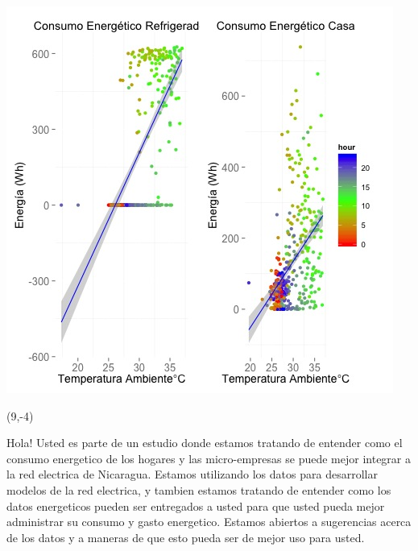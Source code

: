 \documentclass{article}\usepackage[]{graphicx}\usepackage[]{color}
\newenvironment{knitrout}{}{} %
\begin{document}
\begin{knitrout}
\color{fgcolor}
\includegraphics[scale=0.75]{figure/A19_correlaciones} 
\end{knitrout}

 \begin{textblock}{1}(9,-4)
\begin{minipage}{20em}
\begingroup

\endgroup
\end{minipage}
\end{textblock}

\vspace{70px}
\begin{knitrout}
Hola! Usted es parte de un estudio donde estamos tratando de entender como el consumo energetico de los hogares y las micro-empresas se puede mejor integrar a la red electrica de Nicaragua. Estamos utilizando los datos para desarrollar modelos de la red electrica, y tambien estamos tratando de entender como los datos energeticos pueden ser entregados a usted para que usted pueda mejor administrar su consumo y gasto energetico.  Estamos abiertos a sugerencias acerca de los datos y a maneras de que esto pueda ser de mejor uso para usted.
\end{knitrout}
\end{document}
